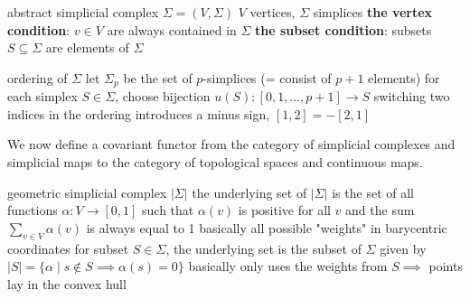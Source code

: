 \begin{outline}
    \1 abstract simplicial complex $\Sigma = (V, \Sigma)$ 
        \2 $V$ vertices, $\Sigma$ simplices
        \3 \textbf{the vertex condition}: $v\in V$ are always contained in $\Sigma$
        \3 \textbf{the subset condition}: subsets $S\subseteq \Sigma$ are elements of $\Sigma$
    
    
    \1 ordering of $\Sigma$
        \2 let $\Sigma_p$ be the set of $p$-simplices (= consist of $p+1$ elements)
        \2 for each simplex $S\in \Sigma$, choose bijection $u(S): [0,1,\ldots,p+1] \rightarrow S$
        \2 switching two indices in the ordering introduces a minus sign, $[1,2]=-[2,1]$
    
\0 We now define a covariant functor from the category of simplicial complexes and simplicial maps to the category of topological spaces and continuous maps.

    \1 geometric simplicial complex $|\Sigma|$
        \2 the underlying set of $|\Sigma|$ is the set of all functions $\alpha: V \rightarrow [0,1]$ such that $\alpha(v)$ is positive for all $v$ and the sum $\sum_{v\in V} \alpha(v)$ is always equal to 1
            \3 basically all possible "weights" in barycentric coordinates
        \2 for subset $S\in \Sigma$, the underlying set is the subset of $\Sigma$ given by $|S|=\{\alpha \mid s \not\in S \implies \alpha(s)=0\}$
            \3 basically only uses the weights from $S \implies$ points lay in the convex hull


\end{outline}
